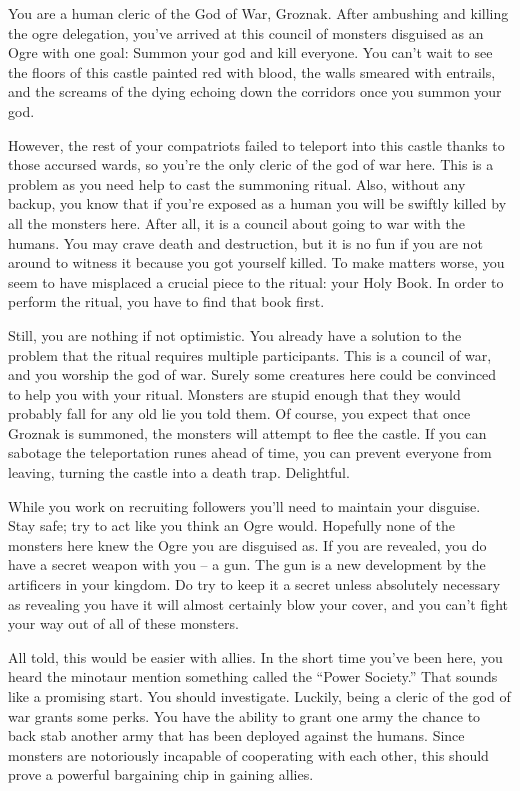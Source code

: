 \documentclass[char]{guildcamp2}
\begin{document}
\name{\cCleric{}}


You are a human cleric of the God of War, Groznak. After ambushing and killing the ogre delegation, you've arrived at this council of monsters disguised as an Ogre with one goal: Summon your god and kill everyone. You can't wait to see the floors of this castle painted red with blood, the walls smeared with entrails, and the screams of the dying echoing down the corridors once you summon your god. 

However, the rest of your compatriots failed to teleport into this castle thanks to those accursed wards, so you're the only cleric of the god of war here. This is a problem as you need help to cast the summoning ritual. Also, without any backup, you know that if you're exposed as a human you will be swiftly killed by all the monsters here. After all, it is a council about going to war with the humans. You may crave death and destruction, but it is no fun if you are not around to witness it because you got yourself killed. To make matters worse, you seem to have misplaced a crucial piece to the ritual: your Holy Book. In order to perform the ritual, you have to find that book first.
		
Still, you are nothing if not optimistic. You already have a solution to the problem that the ritual requires multiple participants. This is a council of war, and you worship the god of war. Surely some creatures here could be convinced to help you with your ritual. Monsters are stupid enough that they would probably fall for any old lie you told them. Of course, you expect that once Groznak is summoned, the monsters will attempt to flee the castle. If you can sabotage the teleportation runes ahead of time, you can prevent everyone from leaving, turning the castle into a death trap. Delightful.
	
While you work on recruiting followers you'll need to maintain your disguise. Stay safe; try to act like you think an Ogre would. Hopefully none of the monsters here knew the Ogre you are disguised as. If you are revealed, you do have a secret weapon with you -- a gun. The gun is a new development by the artificers in your kingdom. Do try to keep it a secret unless absolutely necessary as revealing you have it will almost certainly blow your cover, and you can't fight your way out of all of these monsters.

All told, this would be easier with allies. In the short time you've been here, you heard the minotaur mention something called the ``Power Society.'' That sounds like a promising start. You should investigate. Luckily, being a cleric of the god of war grants some perks. You have the ability to grant one army the chance to back stab another army that has been deployed against the humans. Since monsters are notoriously incapable of cooperating with each other, this should prove a powerful bargaining chip in gaining allies.
\end{document}
